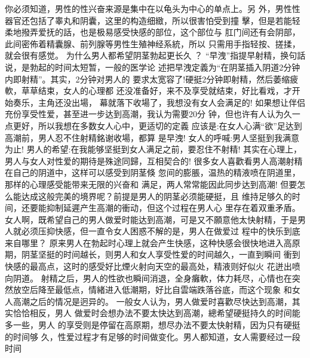 \documentclass[12pt,UTF8]{ctexbook}
\begin{document}
你必须知道，男性的性兴奋来源是集中在以龟头为中心的单点上。另
外，男性性器官还包括了睾丸和阴囊，这里的构造细緻，所以很害怕受到撞
擊，但是若能轻柔地撥弄爱抚的話，也是极易感受快感的部位，这个部位与
肛门间还有会阴部，此间密佈着精囊腺、前列腺等男性生殖神经系統，所以
只需用手指轻按、搓揉，就会很有感觉。
为什么男人都希望阴茎勃起更长久 ？
“早洩”指提早射精，换句話说，是勃起的时间太短暂，一般的医学论
述把早洩定義为“在阴茎插入阴道2分钟内即射精”。其实，2分钟对男人的
要求太宽容了!硬挺2分钟即射精，然后萎缩疲軟，草草结束，女人的心理都
还没准备好，来不及享受就结束，好比看戏，才开始奏乐，主角还没出場，
幕就落下收場了，我想没有女人会满足的!
如果想让伴侣充份享受性爱，甚至进一步达到高潮，我认为需要20分
钟，但也许有人认为久一点更好，所以我想在多数女人心中，更适切的定義
应该是:在女人心满“欲”足达到高潮前，男人忍不住射精銘谢收場，都算
是早洩!
女人的呼喊:男人坚挺到我满意为止!
男人的希望:在我能够坚挺到女人满足之前，要忍住不射精!
其实在心理上，男人与女人对性爱的期待是殊途同歸，互相契合的!
很多女人喜歡看男人高潮射精在自己的阴道中，这样可以感受到阴茎倏
忽间的膨脹，温热的精液喷在阴道里，那样的心理感受能带来无限的兴奋和
满足，两人常常能因此同步达到高潮!
但要怎么能达成这般完美的境界呢？前提是男人的阴茎必须能硬挺，且
维持足够久的时间，还要能抑制延遲产生高潮的衝动，但这个过程在男人心
里存在着双重矛盾。
女人啊，既希望自己的男人做爱时能达到高潮，可是又不願意他太快射精，于是男人就必须压抑快感，但一直令女人困惑不解的是，男人在做爱过
程中的快乐到底来自哪里？
原来男人在勃起时心理上就会产生快感，这种快感会很快地进入高原
期，阴茎坚挺的时间越长，则男人和女人享受性爱的时间越久，一直到瞬间
衝到快感的最高点，这时的感受好比煙火射向天空的最高处，精液则好似火
花迸出喷向阴道。
射精之后，男人的性欲也瞬间消退，全身癱軟，体力耗尽，心情也在突
然放空后降至最低点，情緒进入低潮期，好比自雲端跌落谷底，而这个现象
和女人高潮之后的情况是迥异的。
一般女人认为，男人做爱时喜歡尽快达到高潮，其实恰恰相反，男人
做爱时会想办法不要太快达到高潮，總希望硬挺持久的时间能多一些，男人
的享受则是停留在高原期，想尽办法不要太快射精，因为只有硬挺的时间够
久，性爱过程才有足够的时间做变化。男人都知道，女人需要经过一段时间
\end{document}
